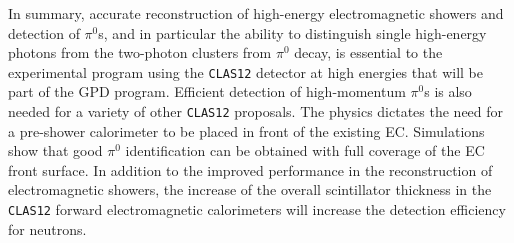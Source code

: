 In summary, accurate reconstruction of high-energy electromagnetic showers 
and detection of $\pi^0$s, and in particular the ability to distinguish 
single high-energy photons from the two-photon clusters from $\pi^0$ decay, 
is essential to the experimental program using the {\tt CLAS12} detector at 
high energies that will be part of the GPD program.  Efficient detection of 
high-momentum $\pi^0$s is also needed for a variety of other {\tt CLAS12} 
proposals.  The physics dictates the need for a pre-shower calorimeter to 
be placed in front of the existing EC.  Simulations show that good $\pi^0$ 
identification can be obtained with full coverage of the EC front surface. 
In addition to the improved performance in the reconstruction of 
electromagnetic showers, the increase of the overall scintillator thickness 
in the {\tt CLAS12} forward electromagnetic calorimeters will increase the 
detection efficiency for neutrons. 


